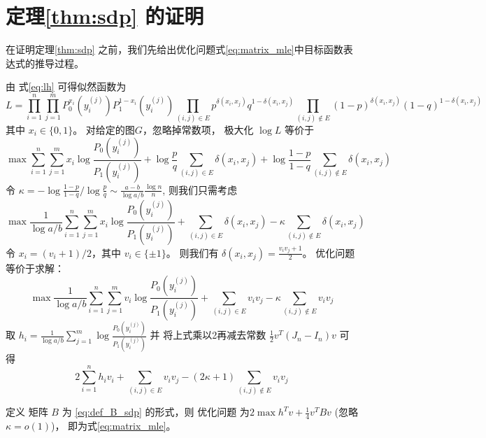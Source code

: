 \section{定理\ref{thm:sdp} 的证明}
\label{sec:thm_sdp_proof}
在证明定理\ref{thm:sdp} 之前，我们先给出优化问题式\eqref{eq:matrix_mle}中目标函数表达式的推导过程。

由 式\eqref{eq:lh} 可得似然函数为
$$
L=\prod_{i=1}^n \prod_{j=1}^m P_0^{x_i}(y_i^{(j)})P_1^{1-x_i}(y_i^{(j)})
\prod_{(i,j) \in E} p^{\delta(x_i, x_j)}q^{1-\delta(x_i, x_j)}
\prod_{(i,j)\not\in E} (1-p)^{\delta(x_i, x_j)}(1-q)^{1-\delta(x_i, x_j)}
$$
其中 $x_i \in \{0,1\}$。
对给定的图$G$，忽略掉常数项， 极大化 $ \log L$ 等价于
$$
\max \sum_{i=1}^n \sum_{j=1}^m x_i \log \frac{P_0(y_i^{(j)})}{P_1(y_i^{(j)})}
+\log\frac{p}{q}\sum_{(i,j) \in E} \delta(x_i, x_j)
+\log \frac{1-p}{1-q}\sum_{(i,j)\not\in E} \delta(x_i, x_j)
$$
令 $\kappa = -\log\frac{1-p}{1-q} / \log\frac{p}{q} \sim \frac{a-b}{\log a/b}\frac{\log n}{n}$,
则我们只需考虑
$$
\max \frac{1}{\log a/b}\sum_{i=1}^n \sum_{j=1}^m x_i \log \frac{P_0(y_i^{(j)})}{P_1(y_i^{(j)})}
+\sum_{(i,j) \in E} \delta(x_i, x_j)
-\kappa\sum_{(i,j)\not\in E} \delta(x_i, x_j)
$$
令 $x_i = (v_i+1)/2$，其中 $v_i \in \{\pm 1 \}$。
则我们有 $\delta(x_i, x_j) = \frac{v_i v_j + 1}{2}$。
优化问题等价于求解：
$$
\max \frac{1}{\log a/b}\sum_{i=1}^n \sum_{j=1}^m v_i \log \frac{P_0(y_i^{(j)})}{P_1(y_i^{(j)})}
+\sum_{(i,j) \in E} v_i v_j
-\kappa\sum_{(i,j)\not\in E} v_i v_j
$$
取 $h_i = \frac{1}{\log a/b}\sum_{j=1}^m \log \frac{P_0(y_i^{(j)})}{P_1(y_i^{(j)})}$
并
将上式乘以2再减去常数 $\frac{1}{2}v^T(J_n-I_n)v$ 可得
$$
2\sum_{i=1}^n h_iv_i + \sum_{(i,j)\in E} v_i v_j - (2\kappa+1) \sum_{(i,j)\not\in E} v_i v_j
$$

定义 矩阵 $B$ 为 \eqref{eq:def_B_sdp} 的形式，则
优化问题 为$2\max h^T v + \frac{1}{4}v^T B v$ (忽略 $\kappa=o(1)$)，
即为式\eqref{eq:matrix_mle}。

